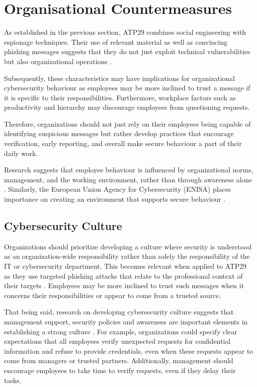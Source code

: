 \section{Organisational Countermeasures}

As established in the previous section, ATP29 combines social engineering with espionage techniques. Their use of relevant material as well as convincing phishing messages suggests that they do not just exploit technical vulnerabilities but also organizational operations \parencite{geers2015cyber, cisa-russia-advisories}. 

Subsequently, these characteristics may have implications for organizational cybersecurity behaviour as employees may be more inclined to trust a message if it is specific to their responsibilities. Furthermore, workplace factors such as productivity and hierarchy may discourage employees from questioning requests. 

Therefore, organizations should not just rely on their employees being capable of identifying suspicious messages but rather develop practices that encourage verification, early reporting, and overall make secure behaviour a part of their daily work. 

Research suggests that employee behaviour is influenced by organizational norms, management, and the working environment, rather than through awareness alone \parencite{Sutton2025}. Similarly, the European Union Agency for Cybersecurity (ENISA) places importance on creating an environment that supports secure behaviour \parencite{europeanSecurity.2018}.  

\subsection{Cybersecurity Culture}

Organizations should prioritize developing a culture where security is understood as an organization-wide responsibility rather than solely the responsibility of the IT or cybersecurity department. This becomes relevant when applied to ATP29 as they use targeted phishing attacks that relate to the professional context of their targets \parencite{geers2015cyber}. Employees may be more inclined to trust such messages when it concerns their responsibilities or appear to come from a trusted source. 

That being said, research on developing cybersecurity culture suggests that management support, security policies and awareness are important elements in establishing a strong culture \parencite{Uchendu2021}. For example, organizations could specify clear expectations that all employees verify unexpected requests for confidential information and refuse to provide credentials, even when these requests appear to come from managers or trusted partners. Additionally, management should encourage employees to take time to verify requests, even if they delay their tasks. 

